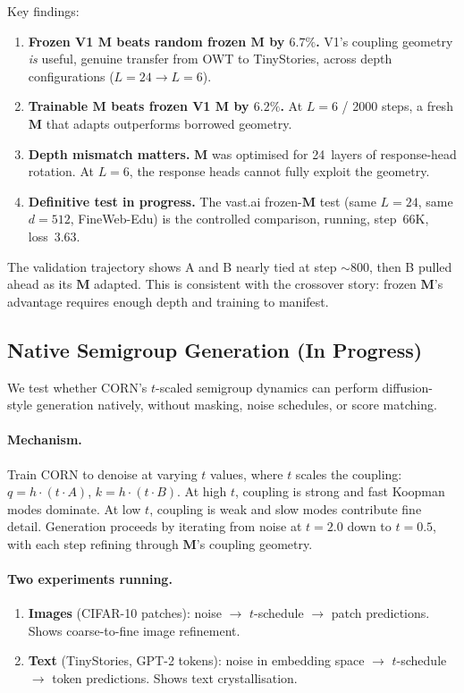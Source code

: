 \documentclass[11pt, a4paper]{article}
\newcommand{\M}{\mathbf{M}}
\theoremstyle{remark}
\begin{document}
Key findings:
\begin{enumerate}[nosep]
\item \textbf{Frozen V1 $\M$ beats random frozen $\M$ by $6.7\%$.}
V1's coupling geometry \emph{is} useful, genuine transfer from OWT to TinyStories, across depth configurations ($L{=}24 \to L{=}6$).

\item \textbf{Trainable $\M$ beats frozen V1 $\M$ by $6.2\%$.}
At $L{=}6$ / 2000 steps, a fresh $\M$ that adapts outperforms borrowed geometry.

\item \textbf{Depth mismatch matters.}
$\M$ was optimised for 24~layers of response-head rotation.
At $L{=}6$, the response heads cannot fully exploit the geometry.

\item \textbf{Definitive test in progress.}
The vast.ai frozen-$\M$ test (same $L{=}24$, same $d{=}512$, FineWeb-Edu) is the controlled comparison, running, step~66K, loss~3.63.
\end{enumerate}

The validation trajectory shows A and B nearly tied at step ${\sim}800$, then B pulled ahead as its $\M$ adapted.
This is consistent with the crossover story: frozen $\M$'s advantage requires enough depth and training to manifest.

\subsection{Native Semigroup Generation (In Progress)}

We test whether CORN's $t$-scaled semigroup dynamics can perform diffusion-style generation natively, without masking, noise schedules, or score matching.

\paragraph{Mechanism.}
Train CORN to denoise at varying $t$ values, where $t$ scales the coupling: $q = h \cdot (t \cdot A)$, $k = h \cdot (t \cdot B)$.
At high $t$, coupling is strong and fast Koopman modes dominate.
At low $t$, coupling is weak and slow modes contribute fine detail.
Generation proceeds by iterating from noise at $t{=}2.0$ down to $t{=}0.5$, with each step refining through $\M$'s coupling geometry.

\paragraph{Two experiments running.}
\begin{enumerate}[nosep]
    \item \textbf{Images} (CIFAR-10 patches): noise $\to$ $t$-schedule $\to$ patch predictions. Shows coarse-to-fine image refinement.
    \item \textbf{Text} (TinyStories, GPT-2 tokens): noise in embedding space $\to$ $t$-schedule $\to$ token predictions. Shows text crystallisation.
\end{enumerate}
\end{document}
